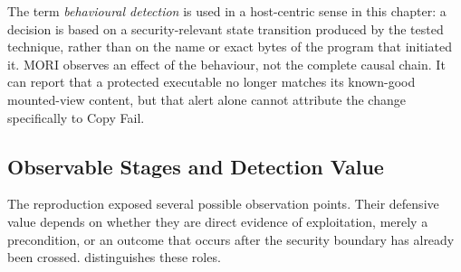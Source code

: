 The term \emph{behavioural detection} is used in a host-centric sense in this
chapter: a decision is based on a security-relevant state transition produced
by the tested technique, rather than on the name or exact bytes of the program
that initiated it. MORI observes an effect of the behaviour, not the complete
causal chain. It can report that a protected executable no longer matches its
known-good mounted-view content, but that alert alone cannot attribute the
change specifically to Copy Fail.

\subsection{Observable Stages and Detection Value}

The reproduction exposed several possible observation points. Their defensive
value depends on whether they are direct evidence of exploitation, merely a
precondition, or an outcome that occurs after the security boundary has
already been crossed.  distinguishes these
roles.

